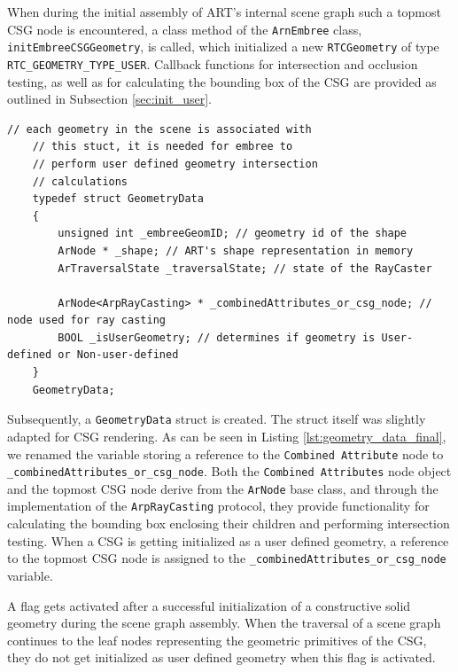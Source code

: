 When during the initial assembly of ART's internal scene graph such a topmost CSG node is encountered, a class method of the \texttt{ArnEmbree} class, \texttt{initEmbreeCSGGeometry}, is called, which initialized a new \texttt{RTCGeometry} of type \texttt{RTC\_GEOMETRY\_TYPE\_USER}. 
Callback functions for intersection and occlusion testing, as well as for calculating the bounding box of the CSG are provided as outlined in Subsection \ref{sec:init_user}. 


\begin{listing} 
	\begin{lstlisting}[caption={Updated \texttt{GeometryData} struct for CSG rendering.}, label={lst:geometry_data_final}]
	// each geometry in the scene is associated with
	// this stuct, it is needed for embree to
	// perform user defined geometry intersection
	// calculations
	typedef struct GeometryData 
	{
		unsigned int _embreeGeomID; // geometry id of the shape
		ArNode * _shape; // ART's shape representation in memory
		ArTraversalState _traversalState; // state of the RayCaster
		
		ArNode<ArpRayCasting> * _combinedAttributes_or_csg_node; // node used for ray casting
		BOOL _isUserGeometry; // determines if geometry is User-defined or Non-user-defined
	}
	GeometryData;
	\end{lstlisting}
\end{listing}

Subsequently, a \texttt{GeometryData} struct is created. The struct itself was slightly adapted for CSG rendering. As can be seen in Listing \ref{lst:geometry_data_final}, we renamed the variable storing a reference to the \texttt{Combined Attribute} node to \texttt{\_combinedAttributes\_or\_csg\_node}. Both the \texttt{Combined Attributes} node object and the topmost CSG node derive from the \texttt{ArNode} base class, and through the implementation of the \texttt{ArpRayCasting} protocol, they provide functionality for calculating the bounding box enclosing their children and performing intersection testing.
When a CSG is getting initialized as a user defined geometry, a reference to the topmost CSG node is assigned to the
\texttt{\_combinedAttributes\_or\_csg\_node} variable.

A flag gets activated after a successful initialization of a constructive solid geometry during the scene graph assembly. When the traversal of a scene graph continues to the leaf nodes representing the geometric primitives of the CSG, they do not get initialized as user defined geometry when this flag is activated.


